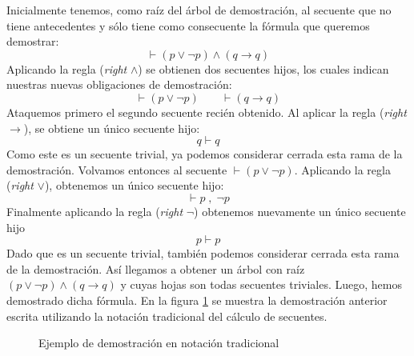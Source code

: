 Inicialmente tenemos, como raíz del árbol de demostración, al secuente que no tiene antecedentes y sólo tiene como consecuente la fórmula que queremos demostrar: $$ \vdash (p \vee \neg p) \wedge (q \rightarrow q)$$
Aplicando la regla (\textit{right} $\wedge$) se obtienen dos secuentes hijos, los cuales indican nuestras nuevas obligaciones de demostración:
$$  \vdash (p \vee \neg p) \;\;\;\;\;\;\; \vdash (q \rightarrow q) $$
Ataquemos primero el segundo secuente recién obtenido. Al aplicar la regla (\textit{right} $\rightarrow$), se obtiene un único secuente hijo: $$ q \vdash q $$
Como este es un secuente trivial, ya podemos considerar cerrada esta rama de la demostración.
Volvamos entonces al secuente $\vdash (p \vee \neg p)$. Aplicando la regla (\textit{right} $\vee$), obtenemos un único secuente hijo:
$$ \vdash p \; , \; \neg p $$
Finalmente aplicando la regla (\textit{right} $\neg$) obtenemos nuevamente un único secuente hijo $$ p \vdash p $$
Dado que es un secuente trivial, también podemos considerar cerrada esta rama de la demostración.
Así llegamos a obtener un árbol con raíz $ (p \vee \neg p) \wedge (q \rightarrow q)$ y cuyas hojas son todas secuentes triviales.
Luego, hemos demostrado dicha fórmula.
En la figura \ref{arbolDemoEjemplo} se muestra la demostración anterior escrita utilizando la notación tradicional del cálculo de secuentes.

\begin{figure}

\begin{prooftree}


\end{prooftree}
\caption{Ejemplo de demostración en notación tradicional}\label{arbolDemoEjemplo}
\end{figure}


%

